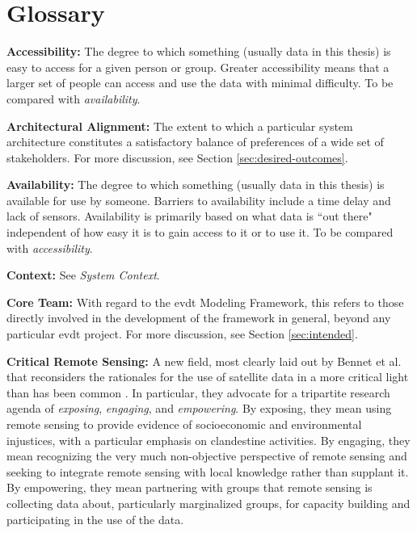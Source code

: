 \chapter{Glossary} \label{glossary}


\textbf{Accessibility:} The degree to which something (usually data in this thesis) is easy to access for a given person or group. Greater accessibility means that a larger set of people can access and use the data with minimal difficulty. To be compared with \textit{availability}.

\textbf{Architectural Alignment:} The extent to which a particular system architecture constitutes a satisfactory balance of preferences of a wide set of stakeholders. For more discussion, see Section \ref{sec:desired-outcomes}.

\textbf{Availability:} The degree to which something (usually data in this thesis) is available for use by someone. Barriers to availability include a time delay and lack of sensors. Availability is primarily based on what data is ``out there" independent of how easy it is to gain access to it or to use it. To be compared with \textit{accessibility}. 


\textbf{Context:} See \textit{System Context}.

\textbf{Core Team:} With regard to the \ac{evdt} Modeling Framework, this refers to those directly involved in the development of the framework in general, beyond any particular \ac{evdt} project. For more discussion, see Section \ref{sec:intended}.

\textbf{Critical Remote Sensing:} A new field, most clearly laid out by Bennet et al. that reconsiders the rationales for the use of satellite data in a more critical light than has been common \cite{bennettPoliticsPixelsReview2022}. In particular, they advocate for a tripartite research agenda of \textit{exposing}, \textit{engaging}, and \textit{empowering}. By exposing, they mean using remote sensing to provide evidence of socioeconomic and environmental injustices, with a particular emphasis on clandestine activities. By engaging, they mean recognizing the very much non-objective perspective of remote sensing and seeking to integrate remote sensing with local knowledge rather than supplant it. By empowering, they mean partnering with groups that remote sensing is collecting data about, particularly marginalized groups, for capacity building and participating in the use of the data.

